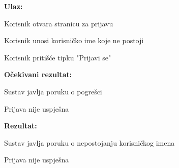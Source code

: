  		\noindent {}
 		\begin{packed_item}
 			
 			\item  \textbf{Ulaz:}
 			
 			\item[] \begin{packed_enum}
 				
 				\item Korisnik otvara stranicu za prijavu
 				\item Korisnik unosi korisničko ime koje ne postoji
 				\item Korisnik pritišće tipku "Prijavi se"
 				
 			\end{packed_enum}
 			
 			\item \textbf{Očekivani rezultat:}
 			
 			\item[] \begin{packed_enum}
 				
 				\item Sustav javlja poruku o pogrešci
 				\item Prijava nije uspješna
 				
 			\end{packed_enum}		
 			
 			\item \textbf{Rezultat:} 
 			
 			\begin{packed_enum}
 				
 				\item Sustav javlja poruku o nepostojanju korisničkog imena
 				\item Prijava nije uspješna
 				
 			\end{packed_enum}
 			
 			
 		\end{packed_item}
 	
 	
 		
